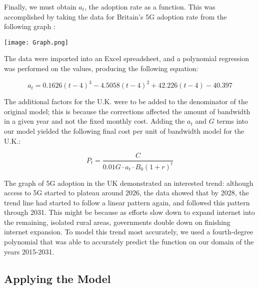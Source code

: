 \documentclass[12pt]{article}
\begin{document}
Finally, we must obtain $a_t$, the adoption rate as a function. This was accomplished by taking the data for Britain's 5G adoption rate from the following graph \cite {fivegarticle}: 

\begin{center}
\texttt{[image: Graph.png]}
\end{center}

The data were imported into an Excel spreadsheet, and a polynomial regression was performed on the values, producing the following equation:

\begin{equation*}
a_t = 0.1626(t-4)^3-4.5058(t-4)^2+42.226(t-4)-40.397
\end{equation*}

The additional factors for the U.K. were to be added to the denominator of the original model; this is because the corrections affected the amount of bandwidth in a given year and not the fixed monthly cost. Adding the $a_t$ and $G$ terms into our model yielded the following final cost per unit of bandwidth model for the U.K.:

\begin{equation*}
    P_t = \frac{C}{0.01 G \cdot a_t \cdot B_0 (1+r)^t} 
\end{equation*}

The graph of 5G adoption in the UK demonstrated an interested trend: although access to 5G started to plateau around 2026, the data showed that by 2028, the trend line had started to follow a linear pattern again, and followed this pattern through 2031. This might be because as efforts slow down to expand internet into the remaining, isolated rural areas, governments double down on finishing internet expansion. To model this trend most accurately, we used a fourth-degree polynomial that was able to accurately predict the function on our domain of the years 2015-2031. 

\subsection{Applying the Model}
\end{document}
